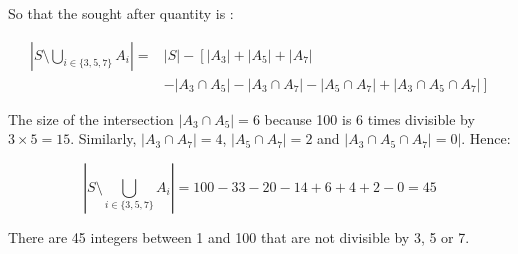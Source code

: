 So that the sought after quantity is :

\begin{equation}
\begin{array}{rl}
\left|S \setminus \bigcup_{i\in\{3,5,7\}} A_i\right| =& |S| - \left[ |A_3| + |A_5| + |A_7| \right.\\
& \left. - |A_3 \cap A_5| - |A_3 \cap A_7| - |A_5\cap A_7| + |A_3\cap A_5\cap A_7|\right]
\end{array}
\end{equation}

The size of the intersection $|A_3\cap A_5| = 6$ because 100 is 6 times divisible by $3\times 5 = 15$. Similarly, $|A_3 \cap A_7| =  4$, $|A_5 \cap A_7| =  2$ and $|A_3\cap A_5 \cap A_7| =  0|$. Hence:

\begin{equation}
\left|S \setminus \bigcup_{i\in\{3,5,7\}} A_i\right| = 100 - 33 - 20 - 14 + 6 + 4 + 2 - 0 = 45
\end{equation}

There are 45 integers between 1 and 100 that are not divisible by 3, 5 or 7.